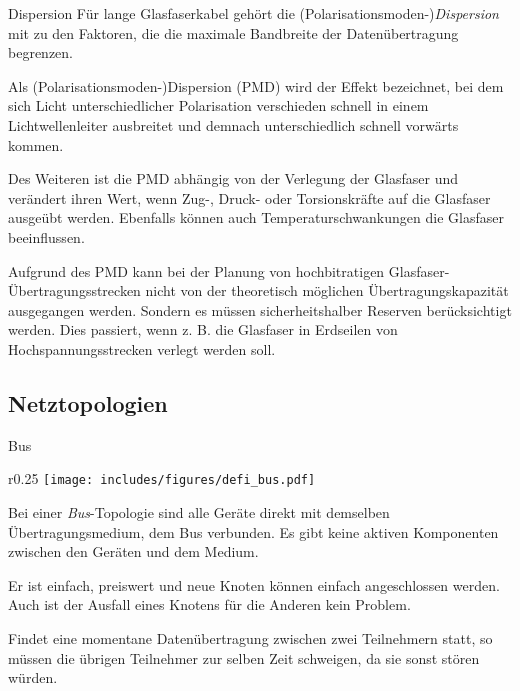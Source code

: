 \begin{bonus}{Dispersion}
    Für lange Glasfaserkabel gehört die (Polarisationsmoden-)\emph{Dispersion} mit zu den Faktoren, die die maximale Bandbreite der Datenübertragung begrenzen.

    Als (Polarisationsmoden-)Dispersion (PMD) wird der Effekt bezeichnet, bei dem sich Licht unterschiedlicher Polarisation verschieden schnell in einem Lichtwellenleiter ausbreitet und demnach unterschiedlich schnell vorwärts kommen.

    Des Weiteren ist die PMD abhängig von der Verlegung der Glasfaser und verändert ihren Wert, wenn Zug-, Druck- oder Torsionskräfte auf die Glasfaser ausgeübt werden.
    Ebenfalls können auch Temperaturschwankungen die Glasfaser beeinflussen.

    Aufgrund des PMD kann bei der Planung von hochbitratigen Glasfaser-Übertragungsstrecken nicht von der theoretisch möglichen Übertragungskapazität ausgegangen werden.
    Sondern es müssen sicherheitshalber Reserven berücksichtigt werden.
    Dies passiert, wenn z. B. die Glasfaser in Erdseilen von Hochspannungsstrecken verlegt werden soll.
\end{bonus}

\subsection{Netztopologien}
\label{ssec:netztopologien}

\begin{defi}{Bus}
    \begin{wrapfigure}{r}{0.25\textwidth}
        \centering
        \texttt{[image: includes/figures/defi\_bus.pdf]}
    \end{wrapfigure}%
    Bei einer \emph{Bus}-Topologie sind alle Geräte direkt mit demselben Übertragungsmedium, dem Bus verbunden.
    Es gibt keine aktiven Komponenten zwischen den Geräten und dem Medium.

    Er ist einfach, preiswert und neue Knoten können einfach angeschlossen werden.
    Auch ist der Ausfall eines Knotens für die Anderen kein Problem.

    Findet eine momentane Datenübertragung zwischen zwei Teilnehmern statt, so müssen die übrigen Teilnehmer zur selben Zeit schweigen, da sie sonst stören würden.
\end{defi}

